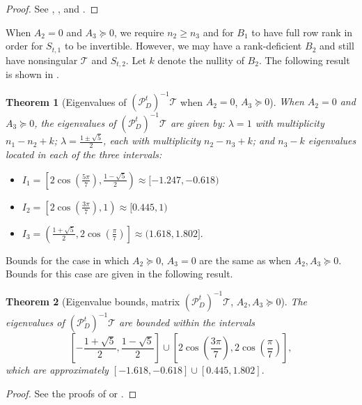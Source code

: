 \documentclass{article}
\newtheorem{theorem}{Theorem}
\newcommand{\sT}{\mathcal{T}}
\begin{document}
\begin{proof}
    See \cite[Theorem 2.3]{sz18}, \cite[Theorem 2.1]{hm19}, and \cite[Theorem 2.2]{cjl21}.
\end{proof}

When $A_2 = 0$ and $A_3 \succeq 0$, we require $n_2 \ge n_3$ and for $B_1$ to have full row rank in order for $S_{t,1}$ to be invertible. However, we may have a rank-deficient $B_2$ and still have nonsingular $\sT$ and $S_{t,2}$. Let $k$ denote the nullity of $B_2$. The following result is shown in \cite[Theorem 3.2]{bg22}.

\begin{theorem}[Eigenvalues of $(\mathcal{P}_D^t)^{-1}\sT$ when $A_2 = 0$, $A_3 \succeq 0$]
	\label{thm:bounds_prec_c10}
	When $A_2 = 0$ and $A_3 \succeq 0$, the eigenvalues of $(\mathcal{P}_D^t)^{-1}\sT$ are given by: $\lambda = 1$ with multiplicity $n_1-n_2+k$; $\lambda = \frac{1 \pm \sqrt{5}}{2}$, each with multiplicity $n_2-n_3+k$; and $n_3-k$ eigenvalues located in each of the three intervals:
	\begin{itemize}
	\item $I_1 = \left[ 2\cos\left( \frac{5\pi}{7} \right), \frac{1 - \sqrt{5}}{2} \right) \approx [-1.247,-0.618)$
	\item $I_2 = \left[ 2\cos\left( \frac{3\pi}{7} \right), 1 \right) \approx [0.445, 1) $
	\item $I_3 = \left( \frac{1 + \sqrt{5}}{2}, 2\cos\left( \frac{\pi}{7} \right) \right] \approx (1.618,1.802].$
	\end{itemize}
\end{theorem}

Bounds for the case in which $A_2 \succeq 0$, $A_3 = 0$ are the same as when $A_2, A_3 \succeq 0$. Bounds for this case are given in the following result.

\begin{theorem} [Eigenvalue bounds,  matrix $(\mathcal{P}_D^t)^{-1}\sT$, $A_2, A_3 \succeq 0$]
\label{thm:bounds_triSC_prec}
The eigenvalues of $(\mathcal{P}_D^t)^{-1}\sT$ are bounded within the intervals 
$$
\left[ -\frac{1+\sqrt5}{2}, \frac{1-\sqrt{5}}{2}\right] \cup \left[ 2\cos\left( \frac{3\pi}{7} \right), 2\cos\left( \frac{\pi}{7} \right)\right],
$$
which are approximately
$[ -1.618, -0.618 ] \cup [ 0.445, 1.802].$
\end{theorem}

\begin{proof}
    See the proofs of \cite[Theorem 3.3]{bg22} or \cite[Theorem 5.3]{pp21}.
\end{proof}
\end{document}

